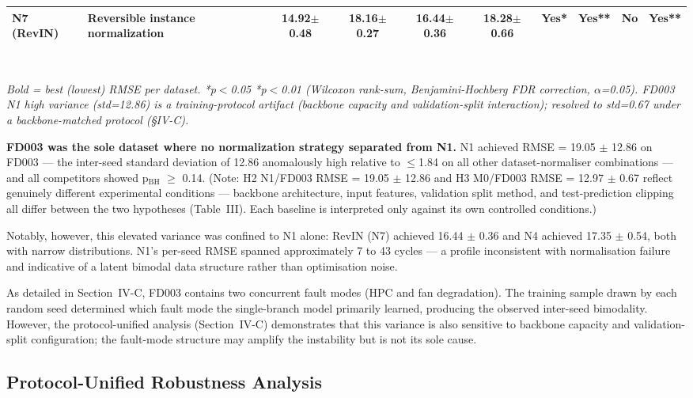 \documentclass[preprint,10pt]{elsarticle}
\begin{document}
\begin{table}[!t]
{\begin{tabular}{llcccccccc}
N7 (RevIN)        & Reversible instance normalization & 14.92$\pm$0.48 & 18.16$\pm$0.27 & 16.44$\pm$0.36 & 18.28$\pm$0.66 & Yes* & Yes** & No & Yes** \\
\bottomrule
\end{tabular}%
}\\[3pt]
\begin{minipage}{\linewidth}
\footnotesize\textit{Bold = best (lowest) RMSE per dataset. *p$<$0.05 \quad **p$<$0.01 (Wilcoxon rank-sum, Benjamini-Hochberg FDR correction, $\alpha$=0.05). FD003 N1 high variance (std=12.86) is a training-protocol artifact (backbone capacity and validation-split interaction); resolved to std=0.67 under a backbone-matched protocol (§IV-C).}
\end{minipage}
\end{table}


\textbf{FD003 was the sole dataset where no normalization strategy separated from N1.} N1 achieved RMSE = 19.05 $\pm$ 12.86 on FD003 --- the inter-seed standard deviation of 12.86 anomalously high relative to $\leq$1.84 on all other dataset-normaliser combinations --- and all competitors showed p$_\text{BH}$ $\geq$ 0.14. (Note: H2 N1/FD003 RMSE = 19.05 $\pm$ 12.86 and H3 M0/FD003 RMSE = 12.97 $\pm$ 0.67 reflect genuinely different experimental conditions --- backbone architecture, input features, validation split method, and test-prediction clipping all differ between the two hypotheses (Table~III). Each baseline is interpreted only against its own controlled conditions.)

Notably, however, this elevated variance was confined to N1 alone: RevIN (N7) achieved 16.44 $\pm$ 0.36 and N4 achieved 17.35 $\pm$ 0.54, both with narrow distributions. N1's per-seed RMSE spanned approximately 7 to 43 cycles --- a profile inconsistent with normalisation failure and indicative of a latent bimodal data structure rather than optimisation noise.

As detailed in Section~IV-C, FD003 contains two concurrent fault modes (HPC and fan degradation). The training sample drawn by each random seed determined which fault mode the single-branch model primarily learned, producing the observed inter-seed bimodality. However, the protocol-unified analysis (Section~IV-C) demonstrates that this variance is also sensitive to backbone capacity and validation-split configuration; the fault-mode structure may amplify the instability but is not its sole cause.

\subsection{Protocol-Unified Robustness Analysis}
\label{subsec:norm_robust}
\end{document}
